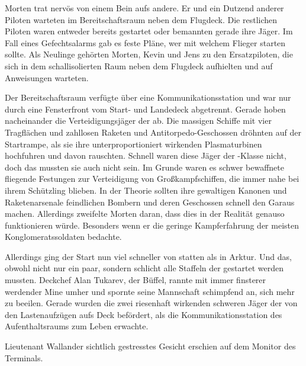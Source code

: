 Morten trat nervös von einem Bein aufs andere. Er und ein Dutzend anderer Piloten warteten im Bereitschaftsraum neben dem Flugdeck. Die restlichen Piloten waren entweder bereits gestartet oder bemannten gerade ihre Jäger. Im Fall eines  Gefechtsalarms gab es feste Pläne, wer mit welchem Flieger starten sollte. Als Neulinge gehörten Morten, Kevin und Jens zu den Ersatzpiloten, die sich in dem schallisolierten Raum neben dem Flugdeck aufhielten und auf Anweisungen warteten.

\par

Der Bereitschaftsraum verfügte über eine Kommunikationsstation und war nur durch eine Fensterfront vom Start- und Landedeck abgetrennt. Gerade hoben nacheinander die Verteidigungsjäger der  ab. Die massigen Schiffe mit vier Tragflächen und zahllosen Raketen und Antitorpedo-Geschossen dröhnten auf der Startrampe, als sie ihre unterproportioniert wirkenden Plasmaturbinen hochfuhren und davon rauschten. Schnell waren diese Jäger der -Klasse nicht, doch das mussten sie auch nicht sein. Im Grunde waren es schwer bewaffnete fliegende Festungen zur Verteidigung von Großkampfschiffen, die immer nahe bei ihrem Schützling blieben. In der Theorie sollten ihre gewaltigen Kanonen und Raketenarsenale feindlichen Bombern und deren Geschossen schnell den Garaus machen. Allerdings zweifelte Morten daran, dass dies in der Realität genauso funktionieren würde. Besonders wenn er die geringe Kampferfahrung der meisten Konglomeratssoldaten bedachte.

\par

Allerdings ging der Start nun viel schneller von statten als in Arktur. Und das, obwohl nicht nur ein paar, sondern schlicht alle Staffeln der  gestartet werden mussten. Deckchef Alan Tukarev, der Büffel, rannte mit immer finsterer werdender Mine umher und spornte seine Mannschaft schimpfend an, sich mehr zu beeilen. Gerade wurden die zwei riesenhaft wirkenden schweren Jäger der  von den Lastenaufzügen aufs Deck befördert, als die Kommunikationsstation des Aufenthaltsraums zum Leben erwachte.

\par

Lieutenant Wallander sichtlich gestresstes Gesicht erschien auf dem Monitor des Terminals. 

\par

